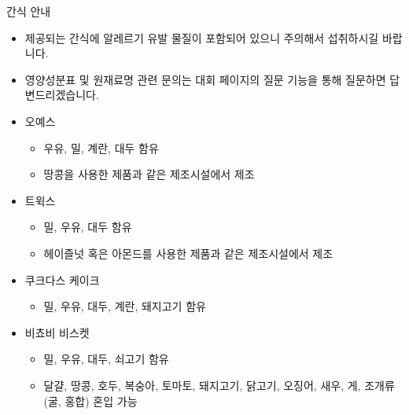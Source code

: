 {
    \indent
    \Large    
    간식 안내
}

\begin{itemize}[noitemsep]
    \item 제공되는 간식에 알레르기 유발 물질이 포함되어 있으니 주의해서 섭취하시길 바랍니다.
    \item 영양성분표 및 원재료명 관련 문의는 대회 페이지의 질문 기능을 통해 질문하면 답변드리겠습니다.
    \item 오예스
    \begin{itemize}[noitemsep]
        \item 우유, 밀, 계란, 대두 함유
        \item 땅콩을 사용한 제품과 같은 제조시설에서 제조
    \end{itemize}
    \item 트윅스
    \begin{itemize}[noitemsep]
        \item 밀, 우유, 대두 함유
        \item 헤이즐넛 혹은 아몬드를 사용한 제품과 같은 제조시설에서 제조
    \end{itemize}
    \item 쿠크다스 케이크
    \begin{itemize}[noitemsep]
        \item 밀, 우유, 대두, 계란, 돼지고기 함유
    \end{itemize}
    \item 비쵸비 비스켓
    \begin{itemize}[noitemsep]
        \item 밀, 우유, 대두, 쇠고기 함유
        \item 달걀, 땅콩, 호두, 복숭아, 토마토, 돼지고기, 닭고기, 오징어, 새우, 게, 조개류(굴, 홍합) 혼입 가능
    \end{itemize}
\end{itemize}